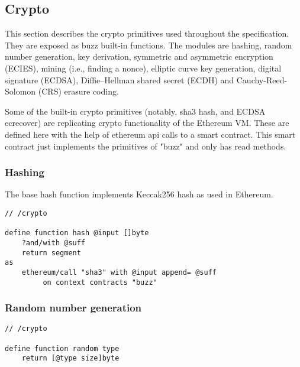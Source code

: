 \subsection{Crypto \statusgreen}\label{spec:format:crypto}

This section describes the crypto primitives used throughout the specification. They  are exposed as  buzz built-in  functions.
The modules are hashing, random number generation, key derivation, symmetric and asymmetric encryption (ECIES), mining (i.e., finding a nonce), elliptic curve key generation, digital signature (ECDSA), Diffie--Hellman shared secret (ECDH) and Cauchy-Reed-Solomon  (CRS) erasure coding.

Some of the built-in crypto primitives (notably, sha3 hash, and ECDSA ecrecover) are replicating crypto functionality of the Ethereum VM. These are defined here with the help of ethereum api calls to a smart contract. This smart contract just implements the primitives of "buzz" and only has read methods.

\subsubsection{Hashing}

The base hash function implements Keccak256 hash as used in Ethereum.

\begin{definition}[Hashing]\label{def:hash}
\begin{lstlisting}[language=buzz1]
// /crypto

define function hash @input []byte
    ?and/with @suff
    return segment
as
    ethereum/call "sha3" with @input append= @suff
         on context contracts "buzz" 
\end{lstlisting}
\end{definition}  


\subsubsection{Random number generation}

\begin{definition}\label{def:rng}
\begin{lstlisting}[language=buzz1]
// /crypto

define function random type 
    return [@type size]byte 

\end{lstlisting}
\end{definition}    


